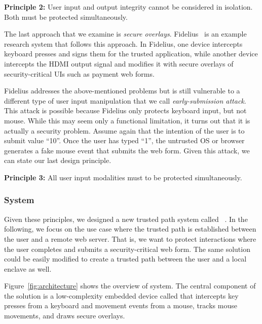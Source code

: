 \begin{tcolorbox}
\textbf{Principle 2:} User input and output integrity cannot be considered in isolation. Both must be protected simultaneously.
\end{tcolorbox}

The last approach that we examine is \emph{secure overlays}. Fidelius~\cite{Fidelius} is an example research system that follows this approach. In Fidelius, one device intercepts keyboard presses and signs them for the trusted application, while another device intercepts the HDMI output signal and modifies it with secure overlays of security-critical UIs such as payment web forms. 

Fidelius addresses the above-mentioned problems but is still vulnerable to a different type of user input manipulation that we call \emph{early-submission attack}. This attack is possible because Fidelius only protects keyboard input, but not mouse. While this may seem only a functional limitation, it turns out that it is actually a security problem. Assume again that the intention of the user is to submit value ``10''. Once the user has typed ``1'', the untrusted OS or browser generates a fake mouse event that submits the web form. Given this attack, we can state our last design principle.

\begin{tcolorbox}
\textbf{Principle 3:} All user input modalities must to be protected simultaneously.
\end{tcolorbox}


\subsubsection*{\protection System}

Given these principles, we designed a new trusted path system called \protection~\cite{protection}. In the following, we focus on the use case where the trusted path is established between the user and a remote web server. That is, we want to protect interactions where the user completes and submits a security-critical web form. The same solution could be easily modified to create a trusted path between the user and a local enclave as well.

Figure~\ref{fig:architecture} shows the overview of \protection system. The central component of the solution is a low-complexity embedded device called \hub that intercepts key presses from a keyboard and movement events from a mouse, tracks mouse movements, and draws secure overlays. 


